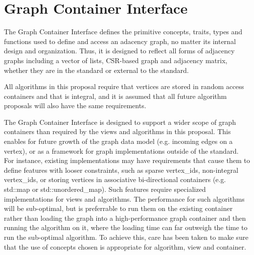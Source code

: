 
\clearpage
\section{Graph Container Interface}


The Graph Container Interface defines the primitive concepts, traits, types and functions used to define and access an adacency graph, no matter its internal design and organization. Thus, it is designed to reflect all forms of adjacency graphs including a vector of lists, CSR-based graph and adjacency matrix, whether they are in the standard or external to the standard.

All algorithms in this proposal require that vertices are stored in random access containers and that  is integral, and it is assumed that all future algorithm proposals will also have the same requirements. 

The Graph Container Interface is designed to support a wider scope of graph containers than required by the views and algorithms in this proposal. This enables for future growth of the graph data model (e.g. incoming edges on a vertex), or as a framework for graph implementations outside of the standard. For instance, existing implementations may have requirements that cause them to define features with looser constraints, such as sparse vertex\_ids, non-integral vertex\_ids, or storing vertices in associative bi-directional containers (e.g. std::map or std::unordered\_map). Such features require specialized implementations for views and algorithms. The performance for such algorithms will be sub-optimal, but is preferrable to run them on the existing container rather than loading the graph into a high-performance graph container and then running the algorithm on it, where the loading time can far outweigh the time to run the sub-optimal algorithm. To achieve this, care has been taken to make sure that the use of concepts chosen is appropriate for algorithm, view and container.




